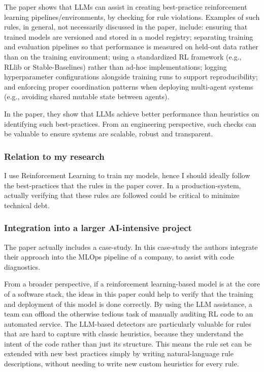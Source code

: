 \documentclass[11pt]{article}
\begin{document}
The paper shows that LLMs can assist in creating best-practice reinforcement learning pipelines/environments, by checking for rule violations. Examples of such rules, in general, not necessarily discussed in the paper, include: ensuring that trained models are versioned and stored in a model registry; separating training and evaluation pipelines so that performance is measured on held-out data rather than on the training environment; using a standardized RL framework (e.g., RLlib or Stable-Baselines) rather than ad-hoc implementations; logging hyperparameter configurations alongside training runs to support reproducibility; and enforcing proper coordination patterns when deploying multi-agent systems (e.g., avoiding shared mutable state between agents).

In the paper, they show that LLMs achieve better performance than heuristics on identifying such best-practices. From an engineering perspective, such checks can be valuable to ensure systems are scalable, robust and transparent. 

\subsubsection{Relation to my research}

I use Reinforcement Learning to train my models, hence I should ideally follow the best-practices that the rules in the paper cover. In a production-system, actually verifying that these rules are followed could be critical to minimize technical debt.  

\subsubsection{Integration into a larger AI-intensive project}

The paper actually includes a case-study. In this case-study the authors integrate their approach into the MLOps pipeline of a company, to assist with code diagnostics. 

From a broader perspective, if a reinforcement learning-based model is at the core of a software stack, the ideas in this paper could help to verify that the training and deployment of this model is done correctly. By using the LLM assistance, a team can offload the otherwise tedious task of manually auditing RL code to an automated service. The LLM-based detectors are particularly valuable for rules that are hard to capture with classic heuristics, because they understand the intent of the code rather than just its structure. This means the rule set can be extended with new best practices simply by writing natural-language rule descriptions, without needing to write new custom heuristics for every rule.
\end{document}
